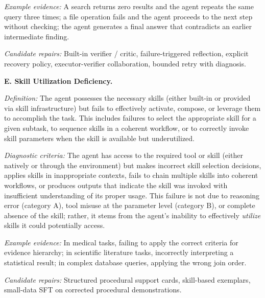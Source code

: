 \textit{Example evidence:} A search returns zero results and the agent repeats the same query three times; a file operation fails and the agent proceeds to the next step without checking; the agent generates a final answer that contradicts an earlier intermediate finding.

\textit{Candidate repairs:} Built-in verifier / critic, failure-triggered reflection, explicit recovery policy, executor-verifier collaboration, bounded retry with diagnosis.

\bigskip
\noindent\textbf{E. Skill Utilization Deficiency.}

\textit{Definition:} The agent possesses the necessary skills (either built-in or provided via skill infrastructure) but fails to effectively activate, compose, or leverage them to accomplish the task. This includes failures to select the appropriate skill for a given subtask, to sequence skills in a coherent workflow, or to correctly invoke skill parameters when the skill is available but underutilized.

\textit{Diagnostic criteria:} The agent has access to the required tool or skill (either natively or through the environment) but makes incorrect skill selection decisions, applies skills in inappropriate contexts, fails to chain multiple skills into coherent workflows, or produces outputs that indicate the skill was invoked with insufficient understanding of its proper usage. This failure is not due to reasoning error (category A), tool misuse at the parameter level (category B), or complete absence of the skill; rather, it stems from the agent's inability to effectively \emph{utilize} skills it could potentially access.

\textit{Example evidence:} In medical tasks, failing to apply the correct criteria for evidence hierarchy; in scientific literature tasks, incorrectly interpreting a statistical result; in complex database queries, applying the wrong join order.

\textit{Candidate repairs:} Structured procedural support cards, skill-based exemplars, small-data SFT on corrected procedural demonstrations.

